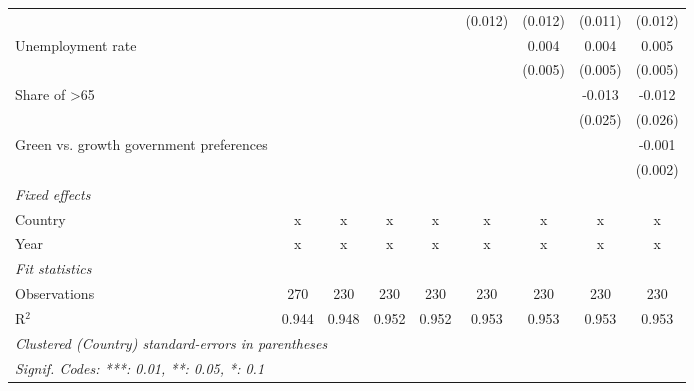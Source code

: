 \begin{table}[htbp]
\begin{tabular}{lcccccccc}
                                                            &         &         &               &               & (0.012)       & (0.012)       & (0.011)       & (0.012)\\   
      Unemployment rate                                     &         &         &               &               &               & 0.004         & 0.004         & 0.005\\   
                                                            &         &         &               &               &               & (0.005)       & (0.005)       & (0.005)\\   
      Share of >65                                          &         &         &               &               &               &               & -0.013        & -0.012\\   
                                                            &         &         &               &               &               &               & (0.025)       & (0.026)\\   
      Green vs. growth government preferences               &         &         &               &               &               &               &               & -0.001\\   
                                                            &         &         &               &               &               &               &               & (0.002)\\   
      \emph{Fixed effects}\\
      Country                                               & x       & x       & x             & x             & x             & x             & x             & x\\  
      Year                                                  & x       & x       & x             & x             & x             & x             & x             & x\\  
      \midrule \emph{Fit statistics}\\
      Observations                                          & 270     & 230     & 230           & 230           & 230           & 230           & 230           & 230\\  
      R$^2$                                                 & 0.944   & 0.948   & 0.952         & 0.952         & 0.953         & 0.953         & 0.953         & 0.953\\  
      \midrule
      \multicolumn{9}{l}{\emph{Clustered (Country) standard-errors in parentheses}}\\
      \multicolumn{9}{l}{\emph{Signif. Codes: ***: 0.01, **: 0.05, *: 0.1}}\\
   \end{tabular}
\end{table}


